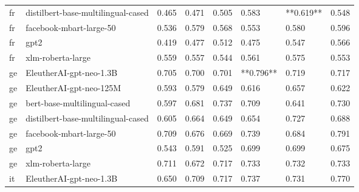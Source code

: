 \begin{tabular}{llllllll}
      fr & distilbert-base-multilingual-cased &     0.465 &                     0.471 &                 0.505 &                  0.583 &                               **0.619** &     0.548 \\
      fr &            facebook-mbart-large-50 &     0.536 &                     0.579 &                 0.568 &                  0.553 &                                   0.580 &     0.596 \\
      fr &                               gpt2 &     0.419 &                     0.477 &                 0.512 &                  0.475 &                                   0.547 &     0.566 \\
      fr &                  xlm-roberta-large &     0.559 &                     0.557 &                 0.544 &                  0.561 &                                   0.575 &     0.553 \\
      ge &            EleutherAI-gpt-neo-1.3B &     0.705 &                     0.700 &                 0.701 &              **0.796** &                                   0.719 &     0.717 \\
      ge &            EleutherAI-gpt-neo-125M &     0.593 &                     0.579 &                 0.649 &                  0.616 &                                   0.657 &     0.622 \\
      ge &       bert-base-multilingual-cased &     0.597 &                     0.681 &                 0.737 &                  0.709 &                                   0.641 &     0.730 \\
      ge & distilbert-base-multilingual-cased &     0.605 &                     0.664 &                 0.649 &                  0.654 &                                   0.727 &     0.688 \\
      ge &            facebook-mbart-large-50 &     0.709 &                     0.676 &                 0.669 &                  0.739 &                                   0.684 &     0.791 \\
      ge &                               gpt2 &     0.543 &                     0.591 &                 0.525 &                  0.699 &                                   0.699 &     0.675 \\
      ge &                  xlm-roberta-large &     0.711 &                     0.672 &                 0.717 &                  0.733 &                                   0.732 &     0.733 \\
      it &            EleutherAI-gpt-neo-1.3B &     0.650 &                     0.709 &                 0.717 &                  0.737 &                                   0.731 &     0.770 \\

\end{tabular}
